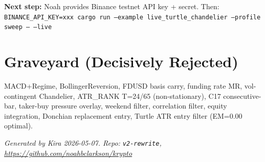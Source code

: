 \documentclass[12pt,a4paper]{article}
\begin{document}
\bigskip
\noindent
\textbf{Next step:} Noah provides Binance testnet API key + secret.
Then: \texttt{BINANCE\_API\_KEY=xxx cargo run --example live\_turtle\_chandelier --profile sweep -- --live}

\section{Graveyard (Decisively Rejected)}

MACD+Regime, BollingerReversion, FDUSD basis carry, funding rate MR,
vol-contingent Chandelier, ATR\_RANK T=24/65 (non-stationary), C17 consecutive-bar,
taker-buy pressure overlay, weekend filter, correlation filter, equity integration,
Donchian replacement entry, Turtle ATR entry filter (EM=0.00 optimal).

\vfill
\noindent
\textit{Generated by Kira 2026-05-07. Repo: \texttt{v2-rewrite}, \url{https://github.com/noahbclarkson/krypto}}
\end{document}

